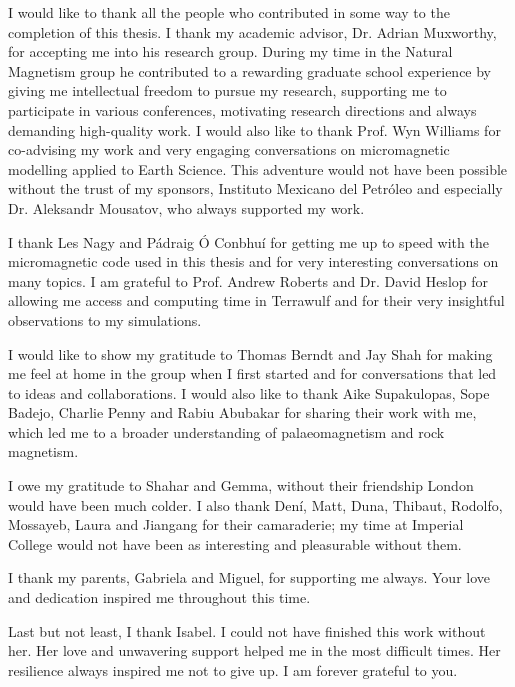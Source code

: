 \let\cleardoublepage\clearpage
{}
{}

\begin{acknowledgements}
I would like to thank all the people who contributed in some way to the completion of this thesis. I thank my academic advisor, Dr. Adrian Muxworthy, for accepting me into his research group. During my time in the Natural Magnetism group he contributed to a rewarding graduate school experience by giving me intellectual freedom to pursue my research, supporting me to participate in various conferences, motivating research directions and always demanding high-quality work. I would also like to thank Prof. Wyn Williams for co-advising my work and very engaging conversations on micromagnetic modelling applied to Earth Science. This adventure would not have been possible without the trust of my sponsors, Instituto Mexicano del Petr\'oleo and especially Dr. Aleksandr Mousatov, who always supported my work.\par

I thank Les Nagy and P\'adraig \'O Conbhu\'i for getting me up to speed with the micromagnetic code used in this thesis and for very interesting conversations on many topics. I am grateful to Prof. Andrew Roberts and Dr. David Heslop for allowing me access and computing time in Terrawulf and for their very insightful observations to my simulations.\par

I would like to show my gratitude to Thomas Berndt and Jay Shah for making me feel at home in the group when I first started and for conversations that led to ideas and collaborations. I would also like to thank Aike Supakulopas, Sope Badejo, Charlie Penny and Rabiu Abubakar for sharing their work with me, which led me to a broader understanding of palaeomagnetism and rock magnetism.\par

I owe my gratitude to Shahar and Gemma, without their friendship London would have been much colder. I also thank Den\'i, Matt, Duna, Thibaut, Rodolfo, Mossayeb, Laura and Jiangang for their camaraderie; my time at Imperial College would not have been as interesting and pleasurable without them.\par

I thank my parents, Gabriela and Miguel, for supporting me always. Your love and dedication inspired me throughout this time.\par

Last but not least, I thank Isabel. I could not have finished this work without her. Her love and unwavering support helped me in the most difficult times. Her resilience always inspired me not to give up. I am forever grateful to you.\par
\end{acknowledgements}
